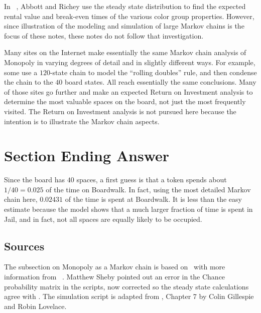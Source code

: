 \documentclass[12pt]{article}
\begin{document}
In~%
\cite{abbott97}, Abbott and Richey use the steady state distribution to
find the expected rental value and break-even times of the various color
group properties.  However, since illustration of the modeling and
simulation of large Markov chains is the focus of these notes, these
notes do not follow that investigation.

Many sites on the Internet make essentially the same Markov chain
analysis of Monopoly in varying degrees of detail and in slightly
different ways.  For example, some use a \( 120 \)-state chain to model
the ``rolling doubles'' rule, and then condense the chain to the \( 40 \)
board states.  All reach essentially the same conclusions.  Many of
those sites go further and make an expected Return on Investment
analysis to determine the most valuable spaces on the board, not just
the most frequently visited.  The Return on Investment analysis is not
pursued here because the intention is to illustrate the Markov chain
aspects.

\section*{Section Ending Answer}

Since the board has \( 40 \) spaces, a first guess is that a token
spends about \( 1/40 = 0.025 \) of the time on Boardwalk.  In fact,
using the most detailed Markov chain here, \( 0.02431 \) of the time is
spent at Boardwalk.  It is less than the easy estimate because the model
shows that a much larger fraction of time is spent in Jail, and in fact,
not all spaces are equally likely to be occupied.

\subsection*{Sources}

The subsection on Monopoly as a Markov chain is based on~%
\cite{abbott97} with more information from~%
\cite{ash72}.  Matthew Sheby pointed out an error in the Chance
probability matrix in the scripts, now corrected so the steady state
calculations agree with
\cite{abbott97}.  The simulation script is adapted from , Chapter 7 by Colin Gillespie and Robin Lovelace.

\hr

\end{document}
